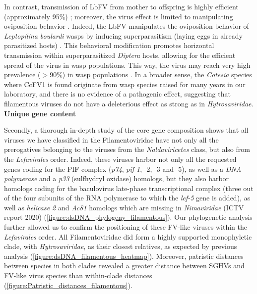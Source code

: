 In contrast, transmission of LbFV from mother to offspring is highly efficient (approximately 95\%) \citep{martinez_competitive_2015}; moreover, the virus effect is limited to manipulating oviposition behavior \citep{varaldi_infectious_2003,varaldi_superparasitism_2005}. Indeed, the LbFV manipulates the oviposition behavior of \textit{Leptopilina boulardi} wasps by inducing superparasitism (laying eggs in already parasitized hosts) \citep{varaldi_infectious_2003}. This behavioral modification promotes horizontal transmission within superparasitized \textit{Diptera} hosts, allowing for the efficient spread of the virus in wasp populations. This way, the virus may reach very high prevalence ($>$90\%) in wasp populations \citep{patot_molecular_2009, patot_prevalence_2010}. In a broader sense, the \textit{Cotesia} species where CcFV1 is found originate from wasp species raised for many years in our laboratory, and there is no evidence of a pathogenic effect, suggesting that filamentous viruses do not have a deleterious effect as strong as in \textit{Hytrosaviridae}.\\
\newpage
\textbf{Unique gene content}

Secondly, a thorough in-depth study of the core gene composition shows that all viruses we have classified in the Filamentoviridae have not only all the prerogatives belonging to the viruses from the \textit{Naldaviricetes} class, but also from the \textit{Lefavirales} order. Indeed, these viruses harbor not only all the requested genes coding for the PIF complex (\textit{p74}, \textit{pif-1}, -2, -3 and -5), as well as a \textit{DNA polymerase} and a \textit{p33} (sulfhydryl oxidase) homologs, but they also harbor homologs coding for the baculovirus late-phase transcriptional complex (three out of the four subunits of the RNA polymerase to which the \textit{lef-5} gene is added), as well as \textit{helicase 2} and \textit{Ac81} homologs which are missing in \textit{Nimaviridae} (ICTV report 2020) (\figurename{\ref{figure:dsDNA_phylogeny_filamentous}}). Our phylogenetic analysis further allowed us to confirm the positioning of these FV-like viruses within the \textit{Lefavirales} order. All Filamentoviridae did form a highly supported monophyletic clade, with \textit{Hytrosaviridae}, as their closest relatives, as expected by previous analysis \citep{lepetit_genome_2017} (\figurename{\ref{figure:dsDNA_filamentous_heatmap}}). Moreover, patristic distances between species in both clades revealed a greater distance between SGHVs and FV-like virus species than within-clade distances (\figurename{\ref{figure:Patristic_distances_filamentous}}).  

